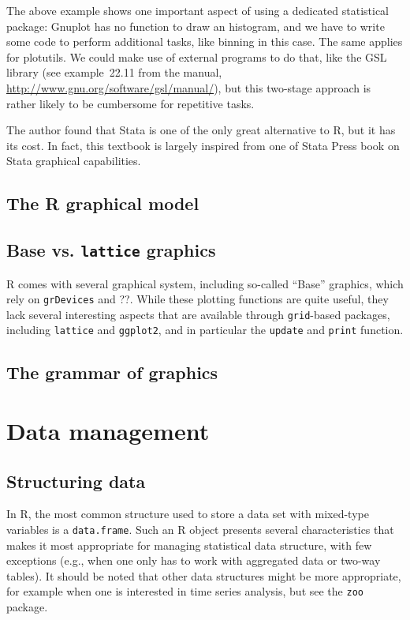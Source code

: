 \documentclass[a4paper,twoside]{book}
\renewcommand{\texttt}[1]{\lstinline{#1}}
\newcommand{\R}{\textsf{R}\xspace}
\begin{document}
The above example shows one important aspect of using a dedicated
statistical package: \textsf{Gnuplot} has no function to draw an
histogram, and we have to write some code to perform additional tasks,
like binning in this case. The same applies for
\textsf{plotutils}. We could make use of external programs to do that,
like the \textsf{GSL} library (see example~22.11 from the manual,
\url{http://www.gnu.org/software/gsl/manual/}), but this two-stage
approach is rather likely to be cumbersome for repetitive tasks.

The author found that \textsf{Stata} is one of the only great
alternative to \R, but it has its cost. In fact, this textbook is
largely inspired from one of Stata Press book on \textsf{Stata}
graphical capabilities\autocite{mitchell08}.

\section{The \R graphical model}

\section{Base vs. {\tt lattice} graphics}

\R comes with several graphical system, including so-called ``Base''
graphics, which rely on \texttt{grDevices} and ??. While these plotting
functions are quite useful, they lack several interesting aspects that are
available through \texttt{grid}-based packages, including \texttt{lattice}
and \texttt{ggplot2}, and in particular the \texttt{update} and
\texttt{print} function. 

\section{The grammar of graphics}

\chapter{Data management}

\section{Structuring data}
In \R, the most common structure used to store a data set with
mixed-type variables is a \texttt{data.frame}. Such an \R object
presents several characteristics that makes it most appropriate for
managing statistical data structure, with few exceptions (e.g., when
one only has to work with aggregated data or two-way tables). It
should be noted that other data structures might be more appropriate,
for example when one is interested in time series analysis, but see
the \texttt{zoo} package\autocite{zeilis05}.
\end{document}
